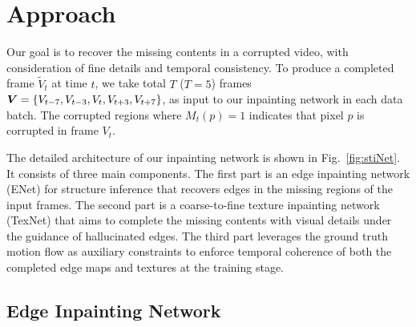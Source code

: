 

\section{Approach}\label{sec:approach}


Our goal is to recover the missing contents in a corrupted video, with consideration of fine details and temporal consistency.
To produce a completed frame $\widetilde{V}_t$ at time $t$, we take total $T$ ($T=5$) frames $\boldsymbol{V}=\{V_{t-7},V_{t-3},V_{t},V_{t+3},V_{t+7}\}$, as input to our inpainting network in each data batch. 
The corrupted regions  where $M_t(p)=1$ indicates that pixel $p$ is corrupted in frame $V_t$. 
%
 
The detailed architecture of our inpainting network is shown in 
Fig.~\ref{fig:stiNet}.
It consists of three main components. 
The first part is an edge inpainting network (ENet) for structure inference that recovers edges in the missing regions of the input frames.
The second part is a coarse-to-fine texture inpainting network (TexNet) that aims to complete the missing contents with visual details under the guidance of hallucinated edges.
The third part leverages the ground truth motion flow as auxiliary constraints to enforce temporal coherence of both the completed edge maps and textures at the training stage.



\subsection{Edge Inpainting Network}
\label{sec:edgenet}
 
